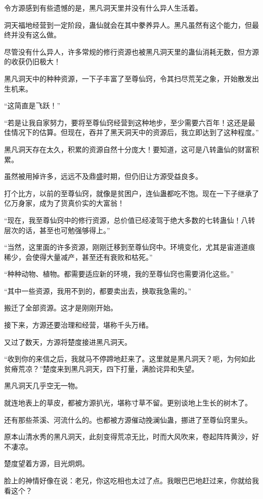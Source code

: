 \begin{this_body}
令方源感到有些遗憾的是，黑凡洞天里并没有什么异人生活着。

洞天福地经营到一定阶段，蛊仙就会在其中豢养异人。黑凡虽然有这个能力，但最终并没有这么做。

尽管没有什么异人，许多常规的修行资源也被黑凡洞天里的蛊仙消耗无数，但方源的收获仍旧极大！

黑凡洞天中的种种资源，一下子丰富了至尊仙窍，令其扫尽荒芜之象，开始散发出生机来。

“这简直是飞跃！”

“若是让我自家努力，要将至尊仙窍经营到这种地步，至少需要六百年！这还是最佳情况下的估算。但现在，吞并了黑天洞天中的资源后，我立即达到了这种程度。”

黑凡洞天存在太久，积累的资源自然十分庞大！要知道，这可是八转蛊仙的财富积累。

虽然被用掉许多，远远不及鼎盛时期，但仍旧让方源受益良多。

打个比方，以前的至尊仙窍，就像是贫困户，连仙蛊都吃不饱。现在一下子继承了亿万身家，成为了货真价实的大富翁！

“现在，我至尊仙窍中的修行资源，总价值已经凌驾于绝大多数的七转蛊仙！八转层次的话，甚至也可勉强够得上。”

“当然，这里面的许多资源，刚刚迁移到至尊仙窍中。环境变化，尤其是宙道道痕稀少，会使得大量减产，甚至还有衰败和枯死。”

“种种动物、植物。都需要适应新的环境，我的至尊仙窍也需要消化这些。”

“其中一些资源，我用不到的，都要卖出去，换取我急需的。”

搬迁了全部资源。这才是刚刚开始。

接下来，方源还要治理和经营，堪称千头万绪。

又过了数天，方源将楚度接进黑凡洞天。

“收到你的来信之后，我就马不停蹄地赶来了。这里就是黑凡洞天？呃，为何如此贫瘠荒凉？”楚度来到黑凡洞天，四下打量，满脸诧异和失望。

黑凡洞天几乎空无一物。

就连地表上的草皮，都被方源扒光，堪称寸草不留。更别谈地上生长的树木了。

还有那些茶溪、河流什么的。也都被方源催动挽澜仙蛊，挪进了至尊仙窍里头。

原本山清水秀的黑凡洞天，此刻变得荒凉无比，时而大风吹来，卷起阵阵黄沙，好不凄凉。

楚度望着方源，目光炯炯。

脸上的神情好像在说：老兄，你这吃相也太过了点。我眼巴巴地赶过来，你就给我看这个？


\end{this_body}
